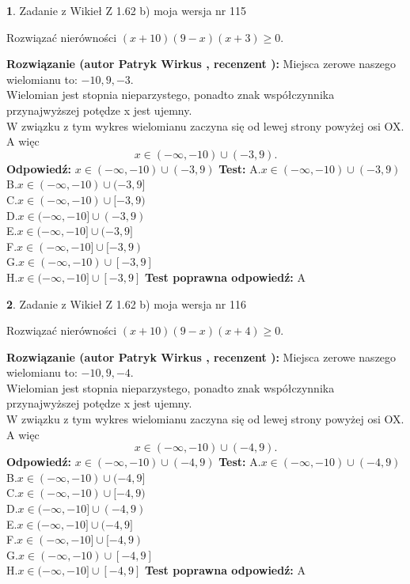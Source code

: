 \documentclass[12pt, a4paper]{article}
\theoremstyle{definition} %
\newtheorem{zad}{}
\newcommand{\zadStart}[1]{\begin{zad}#1\newline}
\newcommand{\zadStop}{\end{zad}}
\newcommand{\rozwStart}[2]{\noindent \textbf{Rozwiązanie (autor #1 , recenzent #2): }\newline}
\newcommand{\rozwStop}{\newline}
\newcommand{\odpStart}{\noindent \textbf{Odpowiedź:}\newline}
\newcommand{\odpStop}{\newline}
\newcommand{\testStart}{\noindent \textbf{Test:}\newline}
\newcommand{\testStop}{\newline}
\newcommand{\kluczStart}{\noindent \textbf{Test poprawna odpowiedź:}\newline}
\newcommand{\kluczStop}{\newline}
\begin{document}
\zadStart{Zadanie z Wikieł Z 1.62 b) moja wersja nr 115}

Rozwiązać nierówności $(x+10)(9-x)(x+3)\ge0$.
\zadStop
\rozwStart{Patryk Wirkus}{}
Miejsca zerowe naszego wielomianu to: $-10, 9, -3$.\\
Wielomian jest stopnia nieparzystego, ponadto znak współczynnika przy\linebreak najwyższej potędze x jest ujemny.\\ W związku z tym wykres wielomianu zaczyna się od lewej strony powyżej osi OX. A więc $$x \in (-\infty,-10) \cup (-3,9).$$
\rozwStop
\odpStart
$x \in (-\infty,-10) \cup (-3,9)$
\odpStop
\testStart
A.$x \in (-\infty,-10) \cup (-3,9)$\\
B.$x \in (-\infty,-10) \cup (-3,9]$\\
C.$x \in (-\infty,-10) \cup [-3,9)$\\
D.$x \in (-\infty,-10] \cup (-3,9)$\\
E.$x \in (-\infty,-10] \cup (-3,9]$\\
F.$x \in (-\infty,-10] \cup [-3,9)$\\
G.$x \in (-\infty,-10) \cup [-3,9]$\\
H.$x \in (-\infty,-10] \cup [-3,9]$
\testStop
\kluczStart
A
\kluczStop



\zadStart{Zadanie z Wikieł Z 1.62 b) moja wersja nr 116}

Rozwiązać nierówności $(x+10)(9-x)(x+4)\ge0$.
\zadStop
\rozwStart{Patryk Wirkus}{}
Miejsca zerowe naszego wielomianu to: $-10, 9, -4$.\\
Wielomian jest stopnia nieparzystego, ponadto znak współczynnika przy\linebreak najwyższej potędze x jest ujemny.\\ W związku z tym wykres wielomianu zaczyna się od lewej strony powyżej osi OX. A więc $$x \in (-\infty,-10) \cup (-4,9).$$
\rozwStop
\odpStart
$x \in (-\infty,-10) \cup (-4,9)$
\odpStop
\testStart
A.$x \in (-\infty,-10) \cup (-4,9)$\\
B.$x \in (-\infty,-10) \cup (-4,9]$\\
C.$x \in (-\infty,-10) \cup [-4,9)$\\
D.$x \in (-\infty,-10] \cup (-4,9)$\\
E.$x \in (-\infty,-10] \cup (-4,9]$\\
F.$x \in (-\infty,-10] \cup [-4,9)$\\
G.$x \in (-\infty,-10) \cup [-4,9]$\\
H.$x \in (-\infty,-10] \cup [-4,9]$
\testStop
\kluczStart
A
\kluczStop
\end{document}

